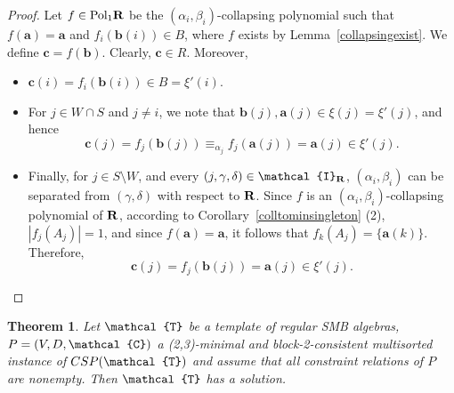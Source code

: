 \documentclass[11pt]{amsart}
\newcommand{\m}[1]{{\uppercase {\mathbf {#1}}}}
\newcommand{\vr}[1]{{\uppercase {\mathcal{#1}}}}
\newcommand{\poln}[2]{{\rm Pol_{#1}\m #2}}
\newtheorem{thm}{Theorem}[section]
\theoremstyle{definition}
\begin{document}
\begin{proof}
Let $f\in\poln{1}{r}$ be the $(\alpha_i,\beta_i)$-collapsing polynomial such that $f(\mathbf{a})=\mathbf{a}$ and $f_i(\mathbf{b}(i))\in B$, where $f$ exists by Lemma~\ref{collapsingexist}. We define $\mathbf{c}=f(\mathbf{b})$. Clearly, $\mathbf{c}\in R$. Moreover,
\begin{itemize}
\item $\mathbf{c}(i)=f_i(\mathbf{b}(i))\in B=\xi'(i)$.
\item For $j\in W\cap S$ and $j\neq i$, we note that $\mathbf{b}(j),\mathbf{a}(j)\in \xi(j)=\xi'(j)$, and hence $$\mathbf{c}(j)=f_j(\mathbf{b}(j))\equiv_{\alpha_j}f_j(\mathbf{a}(j))=\mathbf{a}(j)\in\xi'(j).$$
\item Finally, for $j\in S\setminus W$, and every $(j,\gamma,\delta)\in\vr i_{\m r}$, $(\alpha_i,\beta_i)$ can be separated from $(\gamma,\delta)$ with respect to $\m r$. Since $f$ is an $(\alpha_i,\beta_i)$-collapsing polynomial of $\m r$, according to Corollary~\ref{colltominsingleton} (2), $|f_j(A_j)|=1$, and since $f(\mathbf{a})=\mathbf{a}$, it follows that $f_k(A_j)=\{\mathbf{a}(k)\}$. Therefore, $$\mathbf{c}(j)=f_j(\mathbf{b}(j))=\mathbf{a}(j)\in \xi'(j).$$
\end{itemize}
\end{proof}

\begin{thm}\label{blockminsoln}
Let $\vr t$ be a template of regular SMB algebras, $P=(V,D,\vr c)$ a (2,3)-minimal and block-2-consistent multisorted instance of $CSP(\vr t)$ and assume that all constraint relations of $P$ are nonempty. Then $\vr t$ has a solution.
\end{thm}
\end{document}
